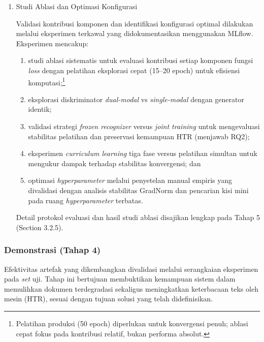\documentclass[12pt,a4paper]{article}
\begin{document}
\begin{enumerate}[label=Fase \arabic*, wide=0pt, itemsep=1em, resume]
    \item Studi Ablasi dan Optimasi Konfigurasi
    
    Validasi kontribusi komponen dan identifikasi konfigurasi optimal dilakukan melalui eksperimen terkawal yang didokumentasikan menggunakan MLflow. Eksperimen mencakup:
    \begin{enumerate}[label=(\arabic*), leftmargin=*, nosep]
        \item studi ablasi sistematis untuk evaluasi kontribusi setiap komponen fungsi \textit{loss} dengan pelatihan eksplorasi cepat (15--20 epoch) untuk efisiensi komputasi;\footnote{Pelatihan produksi (50 epoch) diperlukan untuk konvergensi penuh; ablasi cepat fokus pada kontribusi relatif, bukan performa absolut.}
        \item eksplorasi diskriminator \textit{dual-modal} vs \textit{single-modal} dengan generator identik;
        \item validasi strategi \textit{frozen recognizer} versus \textit{joint training} untuk mengevaluasi stabilitas pelatihan dan preservasi kemampuan HTR (menjawab RQ2);
        \item eksperimen \textit{curriculum learning} tiga fase versus pelatihan simultan untuk mengukur dampak terhadap stabilitas konvergensi; dan
        \item optimasi \textit{hyperparameter} melalui penyetelan manual empiris yang divalidasi dengan analisis stabilitas GradNorm dan pencarian kisi mini pada ruang \textit{hyperparameter} terbatas.
    \end{enumerate}
    Detail protokol evaluasi dan hasil studi ablasi disajikan lengkap pada Tahap 5 (Section 3.2.5).
\end{enumerate}


\subsubsection{Demonstrasi (Tahap 4)}
Efektivitas artefak yang dikembangkan divalidasi melalui serangkaian eksperimen pada \textit{set} uji. Tahap ini bertujuan membuktikan kemampuan sistem dalam memulihkan dokumen terdegradasi sekaligus meningkatkan keterbacaan teks oleh mesin (HTR), sesuai dengan tujuan solusi yang telah didefinisikan.
\end{document}
